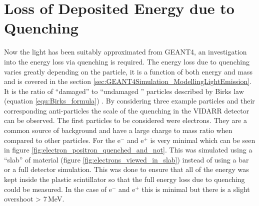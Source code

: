 \section{Loss of Deposited Energy due to Quenching}\label{sec:GEANT4Simulation_quenchingLoss}
Now the light has been suitably approximated from GEANT4, an investigation into the energy loss via quenching is required. The energy loss due to quenching varies greatly depending on the particle, it is a function of both energy and mass and is covered in the section \ref{sec:GEANT4Simulation_ModellingLightEmission}. It is the ratio of ``damaged'' to ``undamaged '' particles \cite{craun_1970} described by Birks law (equation \ref{equ:Birks_formula}) \cite{knoll_2010}. By considering three example particles and their corresponding anti-particles the scale of the quenching in the VIDARR detector can be observed. The first particles to be considered were electrons. They are a common source of background and have a large charge to mass ratio when compared to other particles. For the e$^-$ and e$^+$ is very minimal which can be seen in figure \ref{fig:electron_positron_quenched_and_not}. This was simulated using a ``slab'' of material (figure \ref{fig:electrons_viewed_in_slab}) instead of using a bar or a full detector simulation. This was done to ensure that all of the energy was kept inside the plastic scintillator so that the full energy loss due to quenching could be measured. In the case of e$^-$ and e$^+$ this is minimal but there is a slight overshoot > 7\,MeV. 

